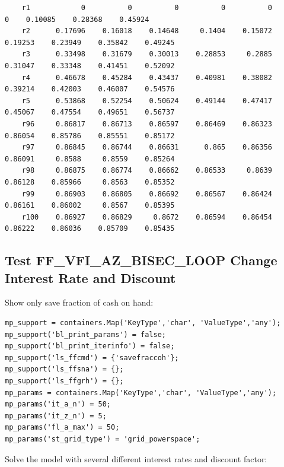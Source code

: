 \documentclass[
]{book}
\begin{document}
\begin{verbatim}
    r1            0          0          0          0          0          0    0.10085    0.28368    0.45924
    r2      0.17696    0.16018    0.14648     0.1404    0.15072    0.19253    0.23949    0.35842    0.49245
    r3      0.33498    0.31679    0.30013    0.28853     0.2885    0.31047    0.33348    0.41451    0.52092
    r4      0.46678    0.45284    0.43437    0.40981    0.38082    0.39214    0.42003    0.46007    0.54576
    r5      0.53868    0.52254    0.50624    0.49144    0.47417    0.45067    0.47554    0.49651    0.56737
    r96     0.86817    0.86713    0.86597    0.86469    0.86323    0.86054    0.85786    0.85551    0.85172
    r97     0.86845    0.86744    0.86631      0.865    0.86356    0.86091     0.8588     0.8559    0.85264
    r98     0.86875    0.86774    0.86662    0.86533     0.8639    0.86128    0.85966     0.8563    0.85352
    r99     0.86903    0.86805    0.86692    0.86567    0.86424    0.86161    0.86002     0.8567    0.85395
    r100    0.86927    0.86829     0.8672    0.86594    0.86454    0.86222    0.86036    0.85709    0.85435
\end{verbatim}

\hypertarget{test-ff_vfi_az_bisec_loop-change-interest-rate-and-discount}{%
\subsection{Test FF\_VFI\_AZ\_BISEC\_LOOP Change Interest Rate and Discount}\label{test-ff_vfi_az_bisec_loop-change-interest-rate-and-discount}}

Show only save fraction of cash on hand:

\begin{verbatim}
mp_support = containers.Map('KeyType','char', 'ValueType','any');
mp_support('bl_print_params') = false;
mp_support('bl_print_iterinfo') = false;
mp_support('ls_ffcmd') = {'savefraccoh'};
mp_support('ls_ffsna') = {};
mp_support('ls_ffgrh') = {};
mp_params = containers.Map('KeyType','char', 'ValueType','any');
mp_params('it_a_n') = 50;
mp_params('it_z_n') = 5;
mp_params('fl_a_max') = 50;
mp_params('st_grid_type') = 'grid_powerspace';
\end{verbatim}

Solve the model with several different interest rates and discount
factor:
\end{document}
